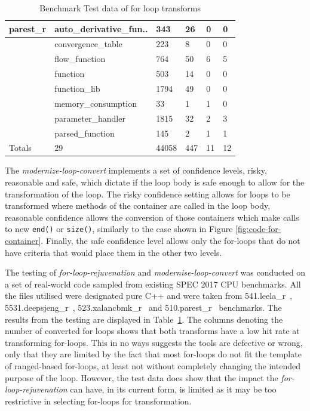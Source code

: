 \documentclass[bsc,frontabs,singlespacing,twoside,parskip,deptreport]{infthesis}
\begin{document}
\begin{table}[h]
\begin{tabular}{|l|l|l|l|l|l|}
parest\_r & auto\_derivative\_fun.. & 343 & 26 & 0 & 0 \\ \hline
 & convergence\_table & 223 & 8 & 0 & 0 \\ \hline
 & flow\_function & 764 & 50 & 6 & 5 \\ \hline
 & function & 503 & 14 & 0 & 0 \\ \hline
 & function\_lib & 1794 & 49 & 0 & 0 \\ \hline
 & memory\_consumption & 33 & 1 & 1 & 0 \\ \hline
 & parameter\_handler & 1815 & 32 & 2 & 3 \\ \hline
 & parsed\_function & 145 & 2 & 1 & 1 \\ \hline
 Totals & 29 & 44058 & 447 & 11 & 12 \\ \hline
\end{tabular}
\caption{Benchmark Test data of for loop transforms }
\label{tab:for-tool-benchmark}
\end{table}

The \textit{modernize-loop-convert} implements a set of confidence levels, risky, reasonable and safe, which dictate if the loop body is safe enough to allow for the transformation of the loop. The risky confidence setting allows for loops to be transformed where methods of the container are called in the loop body, reasonable confidence allows the conversion of those containers which make calls to new \texttt{end()} or \texttt{size()}, similarly to the case shown in Figure \ref{fig:code-for-container}. Finally, the safe confidence level allows only the for-loops that do not have criteria that would place them in the other two levels.

The testing of \textit{for-loop-rejuvenation} and \textit{modernise-loop-convert} was conducted on a set of real-world code sampled from existing SPEC 2017 CPU benchmarks. All the files utilised were designated pure C++ and were taken from 541.leela\_r~\cite{SPEC_LEELA}, 5531.deepsjeng\_r~\cite{SPEC_DEEPSJENG}, 523.xalancbmk\_r~\cite{SPEC_XALANCBMK} and 510.parest\_r~\cite{SPEC_PAREST} benchmarks. The results from the testing are displayed in Table~\ref{tab:for-tool-benchmark}. The columns denoting the number of converted for loops shows that both transforms have a low hit rate at transforming for-loops. This in no ways suggests the tools are defective or wrong, only that they are limited by the fact that most for-loops do not fit the template of ranged-based for-loops, at least not without completely changing the intended purpose of the loop. However, the test data does show that the impact the \textit{for-loop-rejuvenation} can have, in its current form, is limited as it may be too restrictive in selecting for-loops for transformation.
\end{document}

